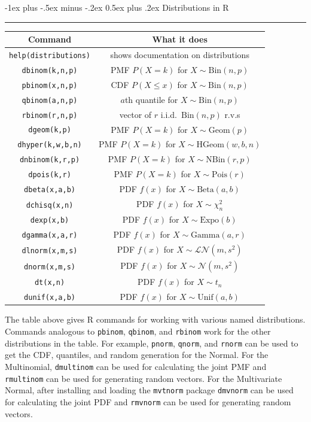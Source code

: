 \documentclass[10pt,landscape]{article}
\makeatletter
\newcommand{\N}{\mathcal{N}}
\newcommand{\Bin}{\textrm{Bin}}
\newcommand{\Beta}{\textrm{Beta}}
\newcommand{\Gam}{\textrm{Gamma}}
\newcommand{\Expo}{\textrm{Expo}}
\newcommand{\Pois}{\textrm{Pois}}
\newcommand{\Unif}{\textrm{Unif}}
\newcommand{\Geom}{\textrm{Geom}}
\newcommand{\NBin}{\textrm{NBin}}
\newcommand{\HGeom}{\textrm{HGeom}}
\renewcommand{\section}{\@startsection{section}{1}{0mm}%
                                {-1ex plus -.5ex minus -.2ex}%
                                {0.5ex plus .2ex}%
                                {\normalfont\large\bfseries}}
\makeatother
\begin{document}
\begin{multicols*}{3}
\vspace{1.5in}

\section{Distributions in R} \smallskip \hrule height 2pt \smallskip

\bigskip

\begin{center}
\begin{tabular}{cc}
\hline
\textbf{Command} & \textbf{What it does} \\
\hline
\texttt{help(distributions)} & shows documentation on distributions\\
\texttt{dbinom(k,n,p)} & PMF $P(X=k)$ for $X \sim \Bin(n,p)$\\
\texttt{pbinom(x,n,p)} & CDF $P(X \leq x)$ for $X \sim \Bin(n,p)$\\
\texttt{qbinom(a,n,p)} &   $a$th quantile for $X \sim \Bin(n,p)$\\
\texttt{rbinom(r,n,p)} &  vector of $r$ i.i.d.~$\Bin(n,p)$ r.v.s\\
\texttt{dgeom(k,p)} & PMF $P(X=k)$ for $X \sim \Geom(p)$\\
\texttt{dhyper(k,w,b,n)} & PMF $P(X=k)$ for $X \sim \HGeom(w,b,n)$\\
\texttt{dnbinom(k,r,p)} & PMF $P(X=k)$ for $X \sim \NBin(r,p)$\\
\texttt{dpois(k,r)} & PMF $P(X=k)$ for $X \sim \Pois(r)$\\
\texttt{dbeta(x,a,b)} & PDF $f(x)$ for $X \sim \Beta(a,b)$\\
\texttt{dchisq(x,n)} & PDF $f(x)$ for $X \sim \chi^2_n$\\
\texttt{dexp(x,b)} & PDF $f(x)$ for $X \sim \Expo(b)$\\
\texttt{dgamma(x,a,r)} & PDF $f(x)$ for $X \sim \Gam(a,r)$\\
\texttt{dlnorm(x,m,s)} & PDF $f(x)$ for $X \sim \mathcal{LN}(m,s^2)$\\
\texttt{dnorm(x,m,s)} & PDF $f(x)$ for $X \sim \N(m,s^2)$\\
\texttt{dt(x,n)} & PDF $f(x)$ for $X \sim t_n$\\
\texttt{dunif(x,a,b)} & PDF $f(x)$ for $X \sim \Unif(a,b)$\\
\hline
\end{tabular}
\end{center}

The table above gives R commands for working with various named distributions. Commands analogous to \texttt{pbinom}, \texttt{qbinom}, and \texttt{rbinom} work for the other distributions in the table. For example, \texttt{pnorm}, \texttt{qnorm}, and \texttt{rnorm} can be used to get the CDF,  quantiles, and random generation for the Normal.  For the Multinomial, \texttt{dmultinom} can be used for calculating the joint PMF and \texttt{rmultinom} can be used for generating random vectors. For the Multivariate Normal, after installing and loading the \texttt{mvtnorm} package \texttt{dmvnorm} can be used for calculating the joint PDF and \texttt{rmvnorm} can be used for generating random vectors.


\end{multicols*}
\end{document}
